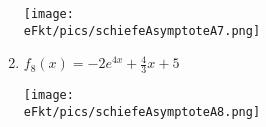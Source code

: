 \begin{Answer}[ref=schAsyA1]
\begin{minipage}{\textwidth}
\begin{minipage}{0.5\textwidth}
\begin{enumerate}[label=\alph*)]
                \begin{minipage}[t]{0.87\textwidth}
					\texttt{[image: \\eFkt/pics/schiefeAsymptoteA7.png]}
				\end{minipage}
				\item \(f_8(x)=-2e^{4x}+\frac{4}{3}x+5\)

                \begin{minipage}[t]{0.87\textwidth}
					\texttt{[image: \\eFkt/pics/schiefeAsymptoteA8.png]}
				\end{minipage}
			\end{enumerate}
		\end{minipage}%
	\end{minipage}
\end{Answer}